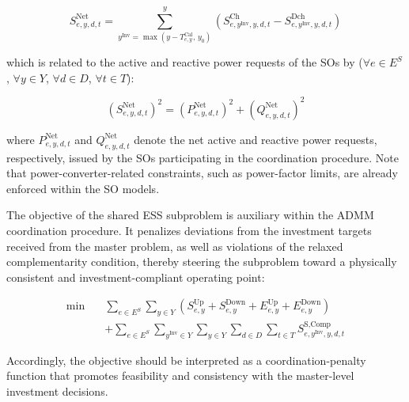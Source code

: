 \documentclass[preprint,12pt]{elsarticle}
\begin{document}
\begin{equation}
    S^\text{Net}_{e,y,d,t} =
    \sum_{y^\text{Inv}=\max(y-T^\text{Cal}_{e,y},\,y_0)}^{y}
    \left(
        S^\text{Ch}_{e,y^\text{Inv},y,d,t}
        -
        S^\text{Dch}_{e,y^\text{Inv},y,d,t}
    \right)
\end{equation}

\noindent
which is related to the active and reactive power requests of the SOs by ($\forall e \in E^S$, $\forall y \in Y$, $\forall d \in D$, $\forall t \in T$):

\begin{equation}
    \left(S^{\text{Net}}_{e,y,d,t}\right)^2 =
    \left(P^{\text{Net}}_{e,y,d,t}\right)^2 +
    \left(Q^{\text{Net}}_{e,y,d,t}\right)^2
\end{equation}

\noindent
where $P^{\text{Net}}_{e,y,d,t}$ and $Q^{\text{Net}}_{e,y,d,t}$ denote the net active and reactive power requests, respectively, issued by the SOs participating in the coordination procedure. Note that power-converter-related constraints, such as power-factor limits, are already enforced within the SO models.

The objective of the shared ESS subproblem is auxiliary within the ADMM coordination procedure. It penalizes deviations from the investment targets received from the master problem, as well as violations of the relaxed complementarity condition, thereby steering the subproblem toward a physically consistent and investment-compliant operating point:

\begin{align}
    \min \quad
    & \sum_{e \in E^S} \sum_{y \in Y}
    \left(
        S^{\text{Up}}_{e,y} +
        S^{\text{Down}}_{e,y} +
        E^{\text{Up}}_{e,y} +
        E^{\text{Down}}_{e,y}
    \right) \\
    & + \sum_{e \in E^S} \sum_{y^\text{Inv} \in Y} \sum_{y \in Y} \sum_{d \in D} \sum_{t \in T}
    S^\text{S,Comp}_{e,y^\text{Inv},y,d,t}
\end{align}

Accordingly, the objective should be interpreted as a coordination-penalty function that promotes feasibility and consistency with the master-level investment decisions.


\end{document}

